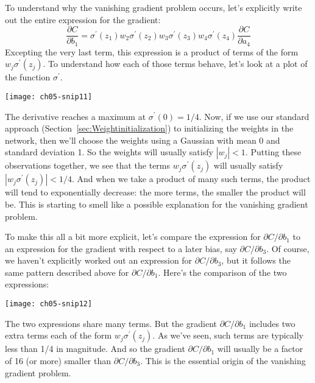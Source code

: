 \label{page:Whythevanishinggradientproblemoccurs}
To understand why the vanishing gradient problem occurs, let's explicitly write out the entire expression for the gradient: 
\begin{equation}
    \frac{\partial C}{\partial b_{1}}=\sigma^{\prime}\left(z_{1}\right) w_{2} \sigma^{\prime}\left(z_{2}\right) w_{3} \sigma^{\prime}\left(z_{3}\right) w_{4} \sigma^{\prime}\left(z_{4}\right) \frac{\partial C}{\partial a_{4}}
    \label{eq:c05-122}
    \end{equation}
Excepting the very last term, this expression is a product of terms of the form $w_{j} \sigma^{\prime}\left(z_{j}\right)$. To understand how each of those terms behave, let's look at a plot of the function $\sigma^\prime$. 

\begin{marginfigure}
    \texttt{[image: ch05-snip11]}
    \end{marginfigure}

The derivative reaches a maximum at $\sigma^{\prime}(0)=1 / 4$. Now, if we use our standard approach (Section~\ref{sec:Weightinitialization}) to initializing the weights in the network, then we'll choose the weights using a Gaussian with mean 0 and standard deviation 1. So the weights will usually satisfy $|w_j|<1$. Putting these observations together, we see that the terms $w_{j} \sigma^{\prime}\left(z_{j}\right)$ will usually satisfy $\left|w_{j} \sigma^{\prime}\left(z_{j}\right)\right|<1 / 4$. And when we take a product of many such terms, the product will tend to exponentially decrease: the more terms, the smaller the product will be. This is starting to smell like a possible explanation for the vanishing gradient problem.

To make this all a bit more explicit, let's compare the expression for $\partial C / \partial b_{1}$
to an expression for the gradient with respect to a later bias, say  $\partial C / \partial b_{3}$. Of course, we haven't explicitly worked out an expression for $\partial C / \partial b_{3}$, but it follows the same pattern described above for $\partial C / \partial b_{1}$. Here's the comparison of the two expressions: 
\begin{figure*}[tph]
    \texttt{[image: ch05-snip12]}
    \label{fig:ch05-snip12}
    \end{figure*}
The two expressions share many terms. But the gradient $\partial C / \partial b_{1}$ includes two extra terms each of the form $w_{j} \sigma^{\prime}\left(z_{j}\right)$. As we've seen, such terms are typically less than 1/4 in magnitude. And so the gradient $\partial C / \partial b_{1}$ will usually be a factor of 16 (or more) smaller than $\partial C / \partial b_{3}$. This is the essential origin of the vanishing gradient problem.

